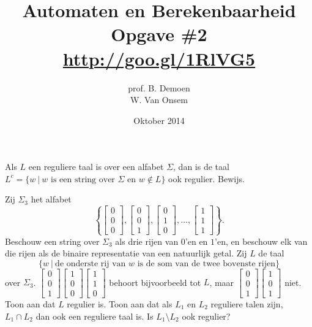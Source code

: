 \documentclass[a4paper]{article}
\title{Automaten en Berekenbaarheid\\Opgave \#2\\\url{http://goo.gl/1RlVG5}}
\author{prof. B. Demoen\\W. Van Onsem}
\date{Oktober 2014}
\newcommand{\kolom}[1]{ \left[ \begin{array}{c} #1 \end{array} \right] }
\begin{document}
\maketitle

\begin{question}
Als $L$ een reguliere taal is over een alfabet $\Sigma$, dan is de taal $L^c = \{ w \ | \ \mbox{$w$  is een string over $\Sigma$ en $w \not\in L$} \}$ ook regulier. Bewijs.
\end{question}

\begin{question}
Zij $\Sigma_3$ het alfabet 
{\tiny
	\[ \left\{ \kolom{ 0 \\ 0 \\ 0}, \kolom{ 0 \\ 0 \\ 1}, \kolom{ 0 \\ 1 \\ 0}, \ldots, \kolom{ 1 \\ 1 \\ 1} \right\}. \]
}
Beschouw een string over $\Sigma_3$ als drie rijen van $0$'en en $1$'en, en beschouw elk van die rijen als de binaire representatie van een natuurlijk getal. Zij $L$ de taal 
\[ \{ w \ | \ \mbox{de onderste rij van $w$ is de som van de twee bovenste rijen} \} \]
over $\Sigma_3$. {\tiny $\kolom{ 0 \\ 0 \\ 1} \kolom{ 1 \\ 0 \\ 0} \kolom{ 1 \\ 1 \\ 0}$} behoort bijvoorbeeld tot $L$, maar { \tiny $\kolom{ 0 \\0 \\ 1} \kolom{ 1 \\ 0 \\ 1}$} niet. Toon aan dat $L$ regulier is.
Toon aan dat als $L_1$ en $L_2$ reguliere talen zijn, $L_1 \cap L_2$ dan ook een reguliere taal is. Is $L_1 \setminus L_2$ ook regulier?
\end{question}
\end{document}
